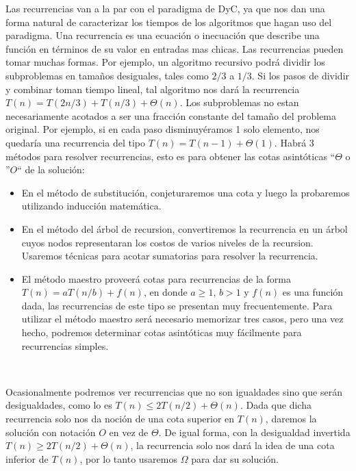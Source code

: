 Las recurrencias van a la par con el paradigma de DyC, ya que nos dan una forma natural de caracterizar los tiempos de los algoritmos que hagan uso del paradigma. Una recurrencia es una ecuaci\'on o inecuaci\'on que describe una funci\'on en t\'erminos de su valor en entradas mas chicas. Las recurrencias pueden tomar muchas formas. Por ejemplo, un algoritmo recursivo podr\'a dividir los subproblemas en tama\~nos desiguales, tales como $2/3$ a $1/3$. Si los pasos de dividir y combinar toman tiempo lineal, tal algoritmo nos dar\'a la recurrencia $T(n) = T(2n/3) + T(n/3) + \Theta(n)$. Los subproblemas no estan necesariamente acotados a ser una fracci\'on constante del tama\~no del problema original. Por ejemplo, si en cada paso disminuy\'eramos 1 solo elemento, nos quedar\'ia una recurrencia del tipo $T(n) = T(n-1) + \Theta(1)$. Habr\'a 3 m\'etodos para resolver recurrencias, esto es para obtener las cotas asint\'oticas ``$\Theta$ o ''$O$`` de la soluci\'on:

\begin{itemize}
 \item En el m\'etodo de substituci\'on, conjeturaremos una cota y luego la probaremos utilizando inducci\'on matem\'atica.
 \item En el m\'etodo del \'arbol de recursion, convertiremos la recurrencia en un \'arbol cuyos nodos representaran los costos de varios niveles de la recursion. Usaremos t\'ecnicas para acotar sumatorias para resolver la recurrencia.
 \item El m\'etodo maestro proveer\'a cotas para recurrencias de la forma $T(n) = aT(n/b) + f(n)$, en donde $a \geq 1$, $b > 1$ y $f(n)$ es una funci\'on dada, las recurrencias de este tipo se presentan muy frecuentemente. Para utilizar el m\'etodo maestro ser\'a necesario memorizar tres casos, pero una vez hecho, podremos determinar cotas asint\'oticas muy f\'acilmente para recurrencias simples.
\end{itemize}

~

Ocasionalmente podremos ver recurrencias que no son igualdades sino que ser\'an desigualdades, como lo es $T(n) \leq 2T(n/2) + \Theta(n)$. Dada que dicha recurrencia solo nos da noci\'on de una cota superior en $T(n)$, daremos la soluci\'on con notaci\'on $O$ en vez de $\Theta$. De igual forma, con la desigualdad invertida $T(n) \geq 2T(n/2) + \Theta(n)$, la recurrencia solo nos dar\'a la idea de una cota inferior de $T(n)$, por lo tanto usaremos $\Omega$ para dar su soluci\'on.

